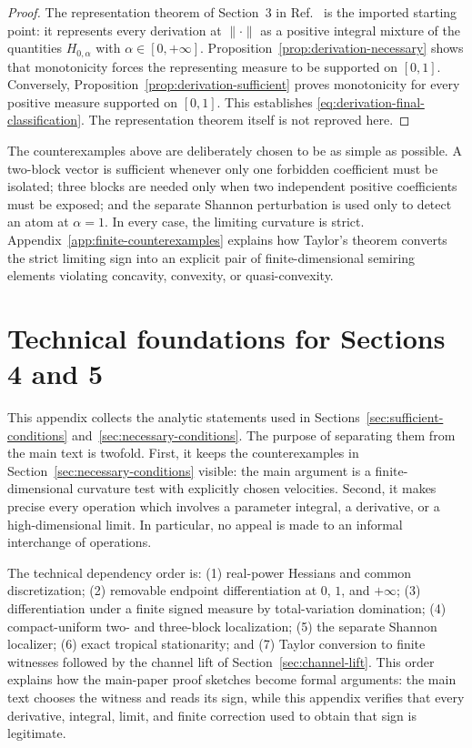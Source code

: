\documentclass[aps,pra,11pt,onecolumn,nofootinbib,tightenlines]{revtex4-2}
\theoremstyle{definition}
\begin{document}
\begin{proof}
The representation theorem of Section~3 in Ref.~\cite{rubboli2026complete} is the imported starting point: it represents every derivation at $\|\cdot\|$ as a positive integral mixture of the quantities $H_{0,\alpha}$ with $\alpha\in[0,+\infty]$. Proposition~\ref{prop:derivation-necessary} shows that monotonicity forces the representing measure to be supported on $[0,1]$. Conversely, Proposition~\ref{prop:derivation-sufficient} proves monotonicity for every positive measure supported on $[0,1]$. This establishes \eqref{eq:derivation-final-classification}. The representation theorem itself is not reproved here.
\end{proof}

The counterexamples above are deliberately chosen to be as simple as possible. A two-block vector is sufficient whenever only one forbidden coefficient must be isolated; three blocks are needed only when two independent positive coefficients must be exposed; and the separate Shannon perturbation is used only to detect an atom at $\alpha=1$. In every case, the limiting curvature is strict. Appendix~\ref{app:finite-counterexamples} explains how Taylor's theorem converts the strict limiting sign into an explicit pair of finite-dimensional semiring elements violating concavity, convexity, or quasi-convexity.

\clearpage
\appendix
\section{Technical foundations for Sections 4 and 5}
\label{app:technical-sections45}

This appendix collects the analytic statements used in Sections~\ref{sec:sufficient-conditions} and~\ref{sec:necessary-conditions}.  The purpose of separating them from the main text is twofold.  First, it keeps the counterexamples in Section~\ref{sec:necessary-conditions} visible: the main argument is a finite-dimensional curvature test with explicitly chosen velocities.  Second, it makes precise every operation which involves a parameter integral, a derivative, or a high-dimensional limit.  In particular, no appeal is made to an informal interchange of operations.

The technical dependency order is: (1) real-power Hessians and common
discretization; (2) removable endpoint differentiation at $0$, $1$, and
$+\infty$; (3) differentiation under a finite signed measure by total-variation
domination; (4) compact-uniform two- and three-block localization; (5) the
separate Shannon localizer; (6) exact tropical stationarity; and (7) Taylor
conversion to finite witnesses followed by the channel lift of
Section~\ref{sec:channel-lift}.  This order explains how the main-paper proof sketches
become formal arguments: the main text chooses the witness and reads its sign,
while this appendix verifies that every derivative, integral, limit, and finite
correction used to obtain that sign is legitimate.
\end{document}
